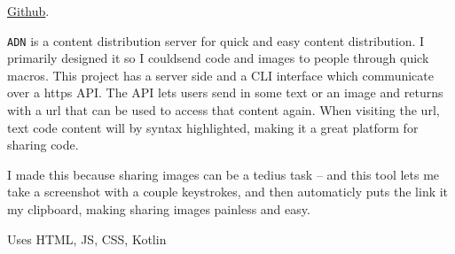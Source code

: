 \documentclass[10pt,letterpaper]{article}
\def\code#1{\texttt{#1}}
\begin{document}
    \href{https://github.com/mee42/adn}{Github}.
    
    \code{ADN} is a content distribution server for quick and easy content distribution.
    I primarily designed it so I couldsend code and images to people through quick macros.
    This project has a server side and a CLI interface which communicate over a https API.
    The API lets users send in some text or an image
    and returns with a url that can be used to access that content again.
    When visiting the url, text code content will by syntax highlighted,
    making it a great platform for sharing code.

    I made this because sharing images can be a tedius task -- 
    and this tool lets me take a screenshot with a couple keystrokes,
    and then automaticly puts the link it my clipboard,
    making sharing images painless and easy.

    \vspace{0.5em}
    \noindent Uses HTML, JS, CSS, Kotlin
\end{document}
